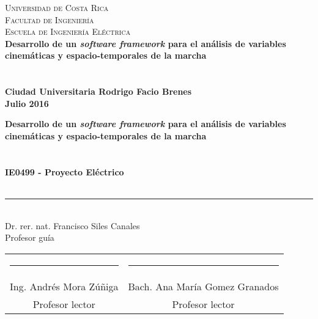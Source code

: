 \documentclass[11pt, letterpaper, twoside, openright]{book}
\begin{document}
\frontmatter
\pagestyle{plain}

\thispagestyle{empty}
\begin{center}
     \Large\textsc{Universidad de Costa Rica \\ Facultad de Ingeniería \\ Escuela de Ingeniería Eléctrica} \\
    \vspace{6cm}
    \LARGE\bfseries{Desarrollo de un \emph{software framework} para el análisis de variables cinemáticas y espacio-temporales de la marcha} \\
    \vspace{2cm}
    \large{} \\
    \vspace{0.5cm}
    \Large{} \\
    \vfill
    \large{Ciudad Universitaria Rodrigo Facio Brenes}\\
    \vspace{0.5cm}
    \large{Julio 2016}
\end{center}
\newpage\null\thispagestyle{empty}\newpage

\thispagestyle{empty}
\begin{center}
    \LARGE\bfseries{Desarrollo de un \emph{software framework} para el análisis de variables cinemáticas y espacio-temporales de la marcha} \\
    \vspace{2cm}
    \large{} \\
    \vspace{0.5cm}
    \Large{} \\
    \vfill
    \large\bfseries{IE0499 - Proyecto Eléctrico} \\
    \vspace{0.5cm}
    \large{} \\
    \vspace{4cm}
    \rule{6cm}{0.1pt}\\
    \normalfont\large{Dr. rer. nat. Francisco Siles Canales} \\
    \normalfont\large{Profesor guía} \\
    \vspace{2cm} 
    \begin{table}[!h]
        \centering
        \begin{tabular}{cc}
            \rule{6cm}{0.1pt}  & \rule{6cm}{0.1pt} \\
            Ing. Andrés Mora Zúñiga & Bach. Ana María Gomez Granados \\
            Profesor lector         & Profesor lector \\
        \end{tabular}
    \end{table}
\end{center}
\end{document}
